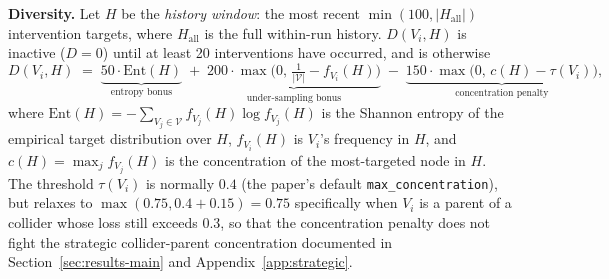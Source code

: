 \documentclass{article}
\theoremstyle{plain}
\theoremstyle{definition}
\theoremstyle{remark}
\begin{document}
\textbf{Diversity.} Let $H$ be the \emph{history window}: the most recent $\min(100, |H_\text{all}|)$ intervention targets, where $H_\text{all}$ is the full within-run history. $D(V_i, H)$ is inactive ($D=0$) until at least 20 interventions have occurred, and is otherwise
\begin{equation}
\label{eq:diversity}
D(V_i, H) \;=\; \underbrace{50 \cdot \mathrm{Ent}(H)}_{\text{entropy bonus}} \;+\; \underbrace{200 \cdot \max\!\big(0,\, \tfrac{1}{|\mathcal V|} - f_{V_i}(H)\big)}_{\text{under-sampling bonus}} \;-\; \underbrace{150 \cdot \max\!\big(0,\, c(H) - \tau(V_i)\big)}_{\text{concentration penalty}},
\end{equation}
where $\mathrm{Ent}(H) = -\sum_{V_j \in \mathcal V} f_{V_j}(H) \log f_{V_j}(H)$ is the Shannon entropy of the empirical target distribution over $H$, $f_{V_i}(H)$ is $V_i$'s frequency in $H$, and $c(H) = \max_j f_{V_j}(H)$ is the concentration of the most-targeted node in $H$. The threshold $\tau(V_i)$ is normally $0.4$ (the paper's default \texttt{max\_concentration}), but relaxes to $\max(0.75, 0.4+0.15)=0.75$ specifically when $V_i$ is a parent of a collider whose loss still exceeds $0.3$, so that the concentration penalty does not fight the strategic collider-parent concentration documented in Section~\ref{sec:results-main} and Appendix~\ref{app:strategic}.
\end{document}
